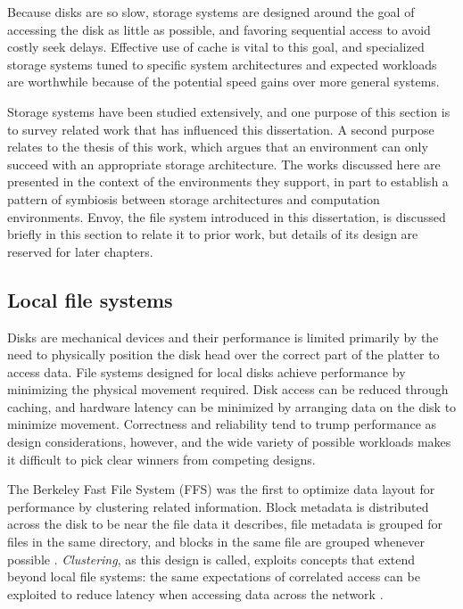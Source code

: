 Because disks are so slow, storage systems are designed around the goal of accessing the disk as little as possible, and favoring sequential access to avoid costly seek delays. Effective use of cache is vital to this goal, and specialized storage systems tuned to specific system architectures and expected workloads are worthwhile because of the potential speed gains over more general systems.

Storage systems have been studied extensively, and one purpose of this section is to survey related work that has influenced this dissertation. A second purpose relates to the thesis of this work, which argues that an environment can only succeed with an appropriate storage architecture. The works discussed here are presented in the context of the environments they support, in part to establish a pattern of symbiosis between storage architectures and computation environments. Envoy, the file system introduced in this dissertation, is discussed briefly in this section to relate it to prior work, but details of its design are reserved for later chapters.

\subsection{Local file systems}

Disks are mechanical devices and their performance is limited primarily by the need to physically position the disk head over the correct part of the platter to access data. File systems designed for local disks achieve performance by minimizing the physical movement required. Disk access can be reduced through caching, and hardware latency can be minimized by arranging data on the disk to minimize movement. Correctness and reliability tend to trump performance as design considerations, however, and the wide variety of possible workloads makes it difficult to pick clear winners from competing designs.

The Berkeley Fast File System (FFS) was the first to optimize data layout for performance by clustering related information. Block metadata is distributed across the disk to be near the file data it describes, file metadata is grouped for files in the same directory, and blocks in the same file are grouped whenever possible \cite{mckusick}. \emph{Clustering}, as this design is called, exploits concepts that extend beyond local file systems: the same expectations of correlated access can be exploited to reduce latency when accessing data across the network \cite{amer}.

